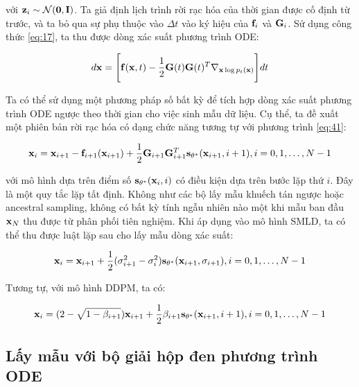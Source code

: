\documentclass{article} %
\begin{document}
với $\bold{z}_i \sim \mathcal{N}(\bold{0}, \bold{I})$.
Ta giả định lịch trình rời rạc hóa của thời gian được cố định từ trước,
và ta bỏ qua sự phụ thuộc vào $\Delta t$ vào ký hiệu của $\bold{f}_i$ và $\bold{G}_i$.
Sử dụng công thức \ref{eq:17}, ta thu được dòng xác suất phương trình ODE:

\begin{equation} \label{eq:42}
    d \bold{x} = \Bigg \lbrack \bold{f}(\bold{x}, t) - \dfrac{1}{2} \bold{G}(t) \bold{G}(t)^T \nabla_{\bold{x} \log p_t (\bold{x})} \Bigg \rbrack dt
\end{equation}

Ta có thể sử dụng một phương pháp số bất kỳ để tích hợp dòng xác suất phương trình ODE ngược theo thời gian cho việc sinh mẫu dữ liệu.
Cụ thể, ta đề xuất một phiên bản rời rạc hóa có dạng chức năng tương tự với phương trình \ref{eq:41}:

\begin{equation*}
    \bold{x}_i = \bold{x}_{i+1} - \bold{f}_{i+1}(\bold{x}_{i+1}) + \dfrac{1}{2} \bold{G}_{i+1} \bold{G}_{i+1}^T \bold{s}_{\bold{\theta}^{\ast}} (\bold{x}_{i+1}, i+1), i = 0, 1, \dots, N - 1
\end{equation*}

với mô hình dựa trên điểm số $\bold{s}_{\bold{\theta}^{\ast}}(\bold{x}_i, i)$ có điều kiện dựa trên bước lặp thứ $i$.
Đây là một quy tắc lặp tất định.
Không như các bộ lấy mẫu khuếch tán ngược hoặc ancestral sampling, không có bất kỳ tính ngẫu nhiên nào một khi mẫu ban đầu $\bold{x}_N$ thu được từ phân phối tiên nghiệm.
Khi áp dụng vào mô hình SMLD, ta có thể thu được luật lặp sau cho lấy mẫu dòng xác suất:

\begin{equation} \label{eq:43}
    \bold{x}_i = \bold{x}_{i+1} + \dfrac{1}{2} (\sigma_{i+1}^2 - \sigma_i^2) \bold{s}_{\bold{\theta}^{\ast}} (\bold{x}_{i+1}, \sigma_{i+1}), i = 0, 1, \dots, N - 1
\end{equation}

Tương tự, với mô hình DDPM, ta có:

\begin{equation} \label{eq:44}
    \bold{x}_i = (2 - \sqrt{1 - \beta_{i+1}}) \bold{x}_{i+1} + \dfrac{1}{2} \beta_{i+1} \bold{s}_{\bold{\theta}^{\ast}} (\bold{x}_{i+1}, i + 1), i = 0, 1, \dots, N - 1
\end{equation}

\subsection{Lấy mẫu với bộ giải hộp đen phương trình ODE} \label{D.4}
\end{document}
